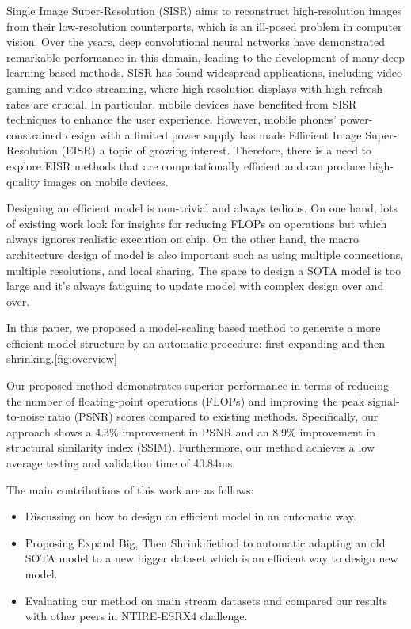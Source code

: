 \documentclass[10pt,twocolumn,letterpaper]{article}
\begin{document}
Single Image Super-Resolution (SISR) aims to reconstruct high-resolution images from their low-resolution counterparts, which is an ill-posed problem in computer vision. Over the years, deep convolutional neural networks have demonstrated remarkable performance in this domain, leading to the development of many deep learning-based methods. SISR has found widespread applications, including video gaming and video streaming, where high-resolution displays with high refresh rates are crucial. In particular, mobile devices have benefited from SISR techniques to enhance the user experience. However, mobile phones' power-constrained design with a limited power supply has made Efficient Image Super-Resolution (EISR) a topic of growing interest. Therefore, there is a need to explore EISR methods that are computationally efficient and can produce high-quality images on mobile devices.

Designing an efficient model is non-trivial and always tedious. On one hand, lots of existing work look for insights for reducing FLOPs on operations but which always ignores realistic execution on chip. On the other hand, the macro architecture design of model is also important such as using multiple connections, multiple resolutions, and local sharing. The space to design a SOTA model is too large and it's always fatiguing to update model with complex design over and over.

In this paper, we proposed a model-scaling based method to generate a more efficient model structure by an automatic procedure: first expanding and then shrinking.\ref{fig:overview}

Our proposed method demonstrates superior performance in terms of reducing the number of floating-point operations (FLOPs) and improving the peak signal-to-noise ratio (PSNR) scores compared to existing methods. Specifically, our approach shows a 4.3\% improvement in PSNR and an 8.9\% improvement in structural similarity index (SSIM). Furthermore, our method achieves a low average testing and validation time of 40.84ms.

The main contributions of this work are as follows:

\begin{itemize}
    \item Discussing on how to design an efficient model in an automatic way.
    \item Proposing \"Expand Big, Then Shrink\" method to automatic adapting an old SOTA model to a new bigger dataset which is an efficient way to design new model.
    \item Evaluating our method on main stream datasets and compared our results with other peers in NTIRE-ESRX4 challenge.
\end{itemize}
\end{document}
